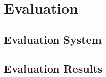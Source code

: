 \chapter{Evaluation}
\label{chapter:chapter5}

\section{Evaluation System}
\label{sec:testing-system}

\section{Evaluation Results}
\label{sub-sec:test-results}
